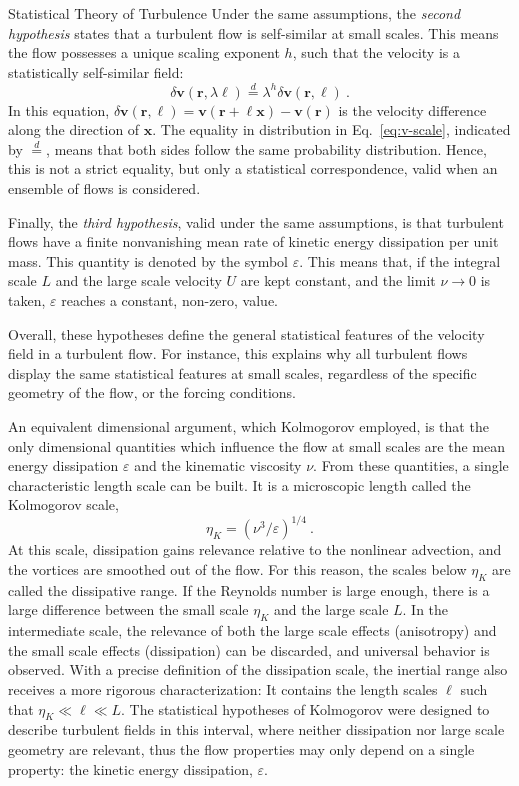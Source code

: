 \begin{chapter}{Statistical Theory of Turbulence}
Under the same assumptions, the \textit{second hypothesis} states that
a turbulent flow is self-similar at small
scales. This means the flow possesses a unique scaling exponent $h$,
such that the velocity is a statistically self-similar field:
\begin{equation} \label{eq:v-scale}
	\delta \mathbf{v} ( \mathbf{r}, \lambda \ell )
	\overset{d}{=}
	\lambda^h \delta \mathbf{v} ( \mathbf{r}, \ell ) \ .
\end{equation}
In this equation, $\delta \mathbf{v} ( \mathbf{r}, \ell ) = \mathbf{v} ( \mathbf{r} +  \ell \mathbf{x} ) - \mathbf{v} ( \mathbf{r})$
is the velocity difference along the direction of $\mathbf{x}$. The equality in distribution in Eq.~\eqref{eq:v-scale}, indicated by $\overset{d}{=}$, means that both sides follow the same probability distribution. Hence, this is not a strict
equality, but only a statistical correspondence, valid when an ensemble of flows is considered.

Finally, the \textit{third hypothesis}, valid under the same assumptions, is that
turbulent flows have a finite
nonvanishing mean rate of kinetic energy dissipation per unit mass.
This quantity is denoted by the symbol $\varepsilon$.
This means that, if the integral scale $L$ and the large scale velocity $U$ are
kept constant, and the limit $\nu \to 0$ is taken, $\varepsilon$ reaches a constant, non-zero, value.

Overall, these hypotheses define the general statistical features of the
velocity field in a turbulent flow. For instance, this explains why all turbulent
flows display the same statistical features at small scales, regardless of the
specific geometry of the flow, or the forcing conditions.

An equivalent dimensional argument, which Kolmogorov employed,
is that the only dimensional quantities which influence
the flow at small scales are the mean energy dissipation $\varepsilon$ and the kinematic
viscosity $\nu$. From these quantities, a single characteristic
length scale can be built. It is a microscopic length called the Kolmogorov
scale,
\begin{equation}
	\eta_K = (\nu^3/\varepsilon)^{1/4} \ .
\end{equation}
At this scale, dissipation gains relevance relative to the nonlinear advection, and the vortices are
smoothed out of the flow. For this reason, the scales
below $\eta_K$ are called the dissipative range.
If the Reynolds number is large enough, there is a large difference between the
small scale $\eta_K$ and the large scale $L$.
In the intermediate scale, the relevance of both the large scale effects (anisotropy)
and the small scale effects (dissipation) can be discarded, and
universal behavior is observed. With a precise definition of the dissipation scale, the inertial range also receives a more rigorous characterization: It contains the length scales $\ell$ such that $\eta_K \ll \ell \ll L$. The statistical hypotheses of Kolmogorov were designed to describe turbulent fields in this interval, where neither dissipation nor large scale geometry are relevant, thus the flow properties may only depend on a single property: the kinetic energy dissipation, $\varepsilon$.


\end{chapter}
